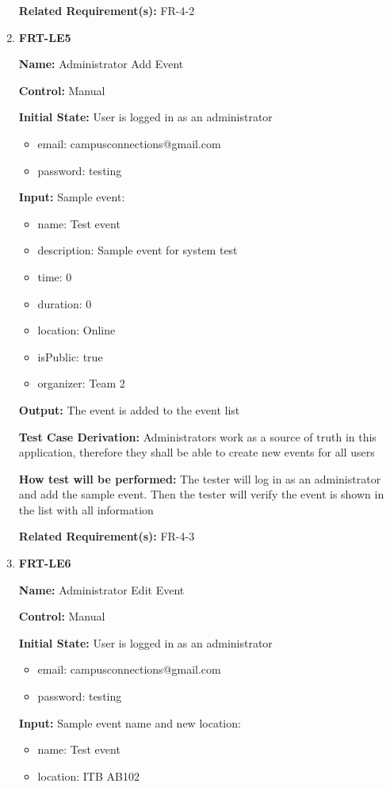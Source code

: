 \documentclass[12pt, titlepage]{article}
\begin{document}
\begin{enumerate}
\textbf{Related Requirement(s):} FR-4-2

\item{\textbf{FRT-LE5}}

\textbf{Name:} Administrator Add Event

\textbf{Control:} Manual
					
\textbf{Initial State:} User is logged in as an administrator
\begin{itemize}
\item email: campusconnections@gmail.com
\item password: testing
\end{itemize}

\textbf{Input:} Sample event:
\begin{itemize}
\item name: Test event
\item description: Sample event for system test
\item time: 0
\item duration: 0
\item location: Online
\item isPublic: true
\item organizer: Team 2
\end{itemize}
					
\textbf{Output:} The event is added to the event list

\textbf{Test Case Derivation:} Administrators work as a source of truth in this application, therefore they shall be able to create new events for all users
					
\textbf{How test will be performed:} The tester will log in as an administrator and add the sample event. Then the tester will verify the event is shown in the list with all information

\textbf{Related Requirement(s):} FR-4-3

\item{\textbf{FRT-LE6}}

\textbf{Name:} Administrator Edit Event

\textbf{Control:} Manual
					
\textbf{Initial State:} User is logged in as an administrator
\begin{itemize}
\item email: campusconnections@gmail.com
\item password: testing
\end{itemize}

\textbf{Input:} Sample event name and new location:
\begin{itemize}
\item name: Test event
\item location: ITB AB102
\end{itemize}
					

\end{enumerate}
\end{document}
